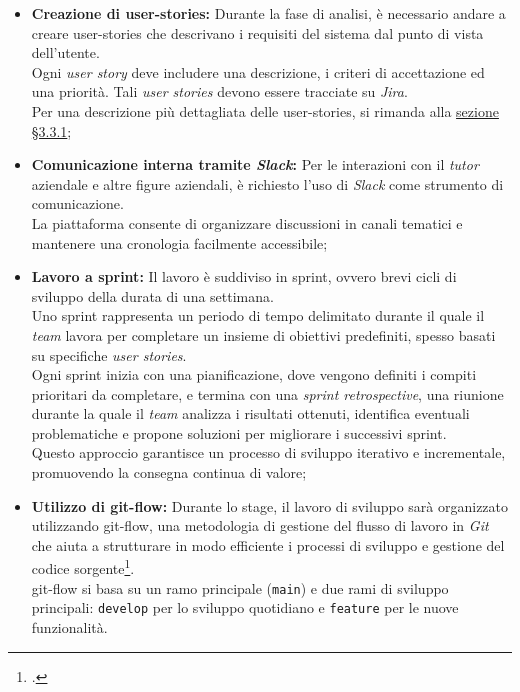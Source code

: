 \begin{itemize}
    \item \textbf{Creazione di \gls{user-stories}:} Durante la fase di analisi, è necessario andare a creare \gls{user-stories} che descrivano i requisiti del sistema dal punto di vista dell’utente.\\
    Ogni \textit{user story} deve includere una descrizione, i criteri di accettazione ed una priorità.
    Tali \textit{user stories} devono essere tracciate su \textit{Jira}.\\
    Per una descrizione più dettagliata delle \gls{user-stories}, si rimanda alla \hyperref[subsec:user-story-mapping]{sezione §3.3.1};
    \item \textbf{Comunicazione interna tramite \textit{Slack}:} Per le interazioni con il \textit{tutor} aziendale e altre figure aziendali, è richiesto l’uso di \textit{Slack} come strumento di comunicazione.\\
    La piattaforma consente di organizzare discussioni in canali tematici e mantenere una cronologia facilmente accessibile;
    \item \textbf{Lavoro a \gls{sprint}:} Il lavoro è suddiviso in \gls{sprint}, ovvero brevi cicli di sviluppo della durata di una settimana.\\
    Uno \gls{sprint} rappresenta un periodo di tempo delimitato durante il quale il \textit{team} lavora per completare un insieme di obiettivi predefiniti, spesso basati su specifiche \textit{user stories}. \\
    Ogni \gls{sprint} inizia con una pianificazione, dove vengono definiti i compiti prioritari da completare, e termina con una \textit{sprint retrospective}, 
    una riunione durante la quale il \textit{team} analizza i risultati ottenuti, identifica eventuali problematiche e propone soluzioni per migliorare i successivi \gls{sprint}. \\
    Questo approccio garantisce un processo di sviluppo iterativo e incrementale, promuovendo la consegna continua di valore;
    \item \textbf{Utilizzo di \gls{git-flow}:} Durante lo stage, il lavoro di sviluppo sarà organizzato utilizzando \gls{git-flow}, una metodologia di gestione del flusso di lavoro in \textit{Git} che aiuta a strutturare in modo efficiente i processi di sviluppo e gestione del codice sorgente\footcite{site:git-flow}.\\
    \gls{git-flow} si basa su un ramo principale (\texttt{main}) e due rami di sviluppo principali: \texttt{develop} per lo sviluppo quotidiano e \texttt{feature} per le nuove funzionalità.\\

\end{itemize}
